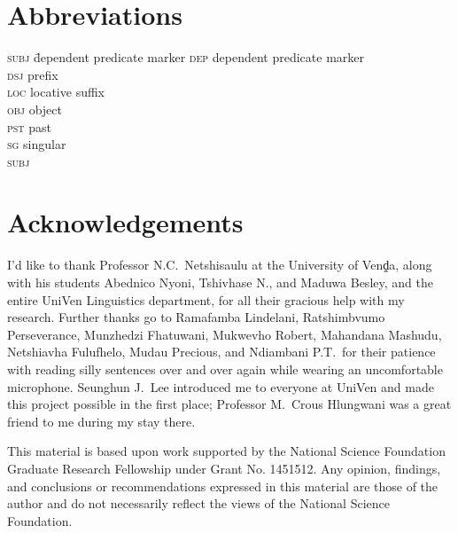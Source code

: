 \documentclass[output=paper,modfonts,nonflat,draftmode]{langsci/langscibook}
\begin{document}
\section*{Abbreviations}
\begin{multicols}{2}
 \begin{tabbing}
  \textsc{subj}\hspace{1em} \= dependent predicate marker\kill
  \textsc{dep} \> dependent predicate marker\\ \textsc{dsj} \>  prefix\\
\textsc{loc} \> locative suffix\\ \textsc{obj} \> object\\ \textsc{pst} \> past\\
\textsc{sg} \> singular\\ \textsc{subj} \> 
 \end{tabbing}

\end{multicols}



\section*{Acknowledgements}

I'd like to thank Professor N.C.\ Netshisaulu at the University of Venḓa,
along with his students Abednico Nyoni, Tshivhase N., and Maduwa Besley, and
the entire UniVen Linguistics department, for all their gracious help with my
 research. Further thanks go to Ramafamba Lindelani,
Ratshimbvumo Perseverance, Munzhedzi Fhatuwani, Mukwevho Robert, Mahandana
Mashudu, Netshiavha Fulufhelo, Mudau Precious, and Ndiambani P.T.\ for their
patience with reading silly sentences over and over again while wearing an
uncomfortable microphone. Seunghun J.\ Lee introduced me to everyone at UniVen
and made this project possible in the first place; Professor M.\ Crous Hlungwani
was a great friend to me during my stay there.

This material is based upon work supported by the National Science Foundation
Graduate Research Fellowship under Grant No. 1451512. Any opinion, findings,
and conclusions or recommendations expressed in this material are those of the
author and do not necessarily reflect the views of the National Science
Foundation.



{\sloppy
\printbibliography[heading=subbibliography,notkeyword=this]}
\end{document}
